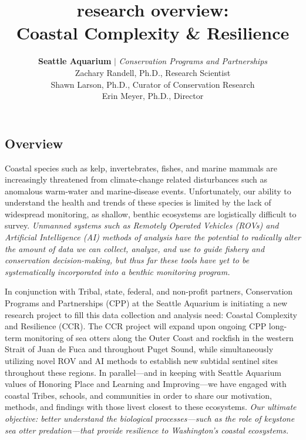 \documentclass[11pt]{article}
\title{
research overview:
\\
Coastal Complexity \& Resilience 
\\
}
\author{
\Large{
\textbf{Seattle Aquarium} 
$\vert$ 
\textit{Conservation Programs and Partnerships}
}
\\
\large{
Zachary Randell, Ph.D., Research Scientist
\\
Shawn Larson, Ph.D., Curator of Conservation Research
\\
Erin Meyer, Ph.D., Director
}
\\
\vspace{10pt}
}
\begin{document}
\begin{titlepage}
\maketitle
\thispagestyle{empty}
\vfill

\section{Overview}
\label{Overview}
Coastal species such as kelp, invertebrates, fishes, and marine mammals 
are increasingly threatened from climate-change related disturbances 
such as anomalous warm-water and marine-disease events. 
Unfortunately, our ability to understand the health and trends of these 
species is limited by the lack of widespread monitoring, as shallow, 
benthic ecosystems are logistically difficult to survey.   
\textit{Unmanned systems such as Remotely Operated Vehicles (ROVs) and 
Artificial Intelligence (AI) methods of analysis have the potential to 
radically alter the amount of data we can collect, analyze, and use to 
guide fishery and conservation decision-making, but thus far these 
tools have yet to be systematically incorporated into a benthic 
monitoring program.} 

In conjunction with Tribal, state, federal, and non-profit partners, Conservation Programs and Partnerships (CPP) at the Seattle Aquarium is initiating a new research project to fill this data collection and analysis need: Coastal Complexity and Resilience (CCR).
The CCR project will expand upon ongoing CPP long-term monitoring of 
sea otters along the Outer Coast and rockfish in the western Strait of 
Juan de Fuca and throughout Puget Sound, while simultaneously utilizing 
novel ROV and AI methods to establish new subtidal sentinel sites 
throughout these regions. 
In parallel---and in keeping with Seattle Aquarium values of Honoring 
Place and Learning and Improving---we have engaged with coastal Tribes, 
schools, and communities in order to share our motivation, methods, and 
findings with those livest closest to these ecosystems. 
\textit{Our ultimate objective: better understand the biological 
processes---such as the role of keystone sea otter predation---that 
provide resilience to Washington's coastal ecosystems.}


\end{titlepage}
\end{document}
